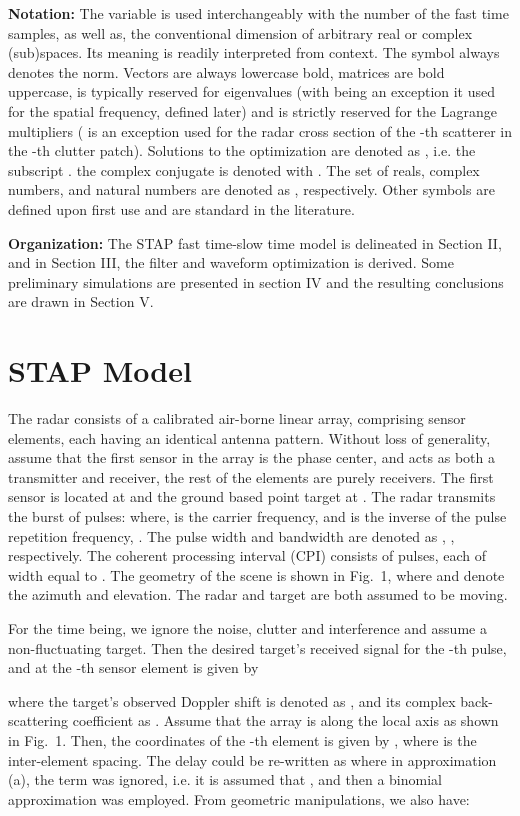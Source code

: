\documentclass[11pt,draftclsnofoot,onecolumn]{IEEEtran}
\theoremstyle{definition}
\theoremstyle{remark}
\begin{document}
{\bf Notation:} The variable  is used interchangeably with the number of the fast time samples, as well as, the conventional dimension of arbitrary real or complex (sub)spaces. Its meaning is readily interpreted from context. The  symbol  always denotes the  norm. Vectors are always lowercase bold, matrices are bold uppercase,  is typically reserved for eigenvalues (with  being an exception it used for the spatial frequency, defined later) and  is strictly reserved for the Lagrange multipliers ( is an exception used for the radar cross section of the -th scatterer in the -th clutter patch). Solutions to the optimization are denoted as , i.e. the subscript . the complex conjugate is denoted with . The set of reals, complex numbers, and natural numbers are denoted as , respectively. Other symbols are defined upon first use and are standard in the literature. 

{\bf Organization:} The STAP fast time-slow time model is delineated in Section II, and in Section III, the filter and waveform optimization is derived. Some preliminary simulations are presented in section IV and  the resulting conclusions are drawn in Section V.




\section{STAP Model}
The radar consists of a calibrated  air-borne linear array, comprising  sensor elements, each having an identical antenna pattern. Without loss of generality, assume that the first sensor in the array is the phase center, and acts as both a transmitter and receiver, the rest of the elements are purely receivers. The first sensor is located at  and the ground based point target at  . The radar transmits the burst of pulses: 
where,  is the carrier frequency, and  is the inverse of the pulse repetition frequency, . The pulse width and bandwidth are denoted as , , respectively. The coherent processing interval (CPI) consists of  pulses, each of width equal to . The geometry of the scene is shown in Fig.~1, where  and  denote the azimuth and elevation. The radar and target are both assumed to be moving. 

For the time being, we ignore the noise, clutter and interference and assume a non-fluctuating target. Then the desired target's received signal for the -th pulse, and at the -th sensor element is given by

where the target's observed Doppler shift is denoted as , and its  complex back-scattering coefficient  as  . Assume that the array is along the local  axis as shown in Fig.~1. Then, the coordinates of the -th element is given by , where  is the inter-element spacing. The delay  could be re-written as
\small 
where in approximation (a), the term  was ignored, i.e. it is assumed that , and then a binomial approximation was employed. From geometric manipulations, we also have:
\end{document}
